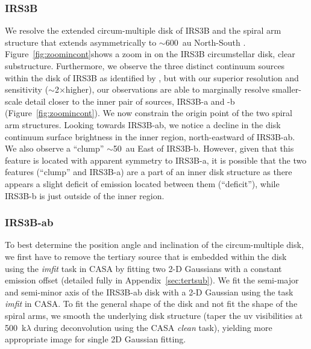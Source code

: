 \documentclass[twocolumn, 12pt,trackchanges]{aastex63}
\newcommand{\ab}{$\sim$}
\begin{document}
\subsubsection{IRS3B}
We resolve the extended circum-multiple disk of IRS3B and the spiral arm structure that extends asymmetrically to \ab600~au North-South  . Figure~\ref{fig:zoomincont}\space shows a zoom in on the IRS3B circumstellar disk,  clear substructure. Furthermore, we observe the three distinct continuum sources within the disk of IRS3B as identified by \citet{2016Natur.538..483T}, but with our superior resolution and sensitivity (\ab2$\times$\space higher), our observations are able to marginally resolve smaller-scale detail closer to the inner pair of sources, IRS3B-a and -b (Figure~\ref{fig:zoomincont}). We now constrain the origin point of the two spiral arm structures. Looking towards IRS3B-ab, we notice a decline in the disk continuum surface brightness in the inner region, north-eastward of IRS3B-ab. We also observe a ``clump'' \ab50~au East of IRS3B-b. However, given that this feature is located with apparent symmetry to IRS3B-a, it is possible that the two features (``clump'' and IRS3B-a) are a part of an inner disk structure as there appears a slight deficit of emission located between them (``deficit''), while IRS3B-b is just outside of the inner region. 

\subsubsection{IRS3B-ab}
To best determine the position angle and inclination of the circum-multiple disk, we first have to remove the tertiary source that is embedded within the disk using the \textit{imfit} task in CASA by fitting two 2-D Gaussians with a constant emission offset (detailed fully in Appendix~\ref{sec:tertsub}). We fit the semi-major and semi-minor axis of the IRS3B-ab disk with a 2-D Gaussian using the task \textit{imfit} in CASA. To fit the general shape of the disk and not fit the shape of the spiral arms, we smooth the underlying disk structure (taper the uv visibilities at 500~k$\lambda$ during deconvolution using the CASA \textit{clean} task), yielding more appropriate image for single 2D Gaussian fitting. 
\end{document}

